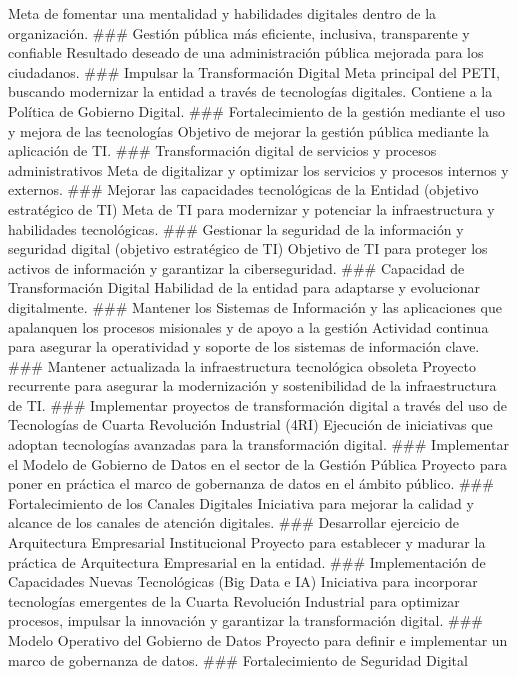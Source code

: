 \documentclass[
	a4paper, %
	12pt, %
]{include/CSSullivanBusinessReport}
\begin{document}
Meta de fomentar una mentalidad y habilidades digitales dentro de la
organización. \#\#\# Gestión pública más eficiente, inclusiva,
transparente y confiable Resultado deseado de una administración pública
mejorada para los ciudadanos. \#\#\# Impulsar la Transformación Digital
Meta principal del PETI, buscando modernizar la entidad a través de
tecnologías digitales. Contiene a la Política de Gobierno Digital.
\#\#\# Fortalecimiento de la gestión mediante el uso y mejora de las
tecnologías Objetivo de mejorar la gestión pública mediante la
aplicación de TI. \#\#\# Transformación digital de servicios y procesos
administrativos Meta de digitalizar y optimizar los servicios y procesos
internos y externos. \#\#\# Mejorar las capacidades tecnológicas de la
Entidad (objetivo estratégico de TI) Meta de TI para modernizar y
potenciar la infraestructura y habilidades tecnológicas. \#\#\#
Gestionar la seguridad de la información y seguridad digital (objetivo
estratégico de TI) Objetivo de TI para proteger los activos de
información y garantizar la ciberseguridad. \#\#\# Capacidad de
Transformación Digital Habilidad de la entidad para adaptarse y
evolucionar digitalmente. \#\#\# Mantener los Sistemas de Información y
las aplicaciones que apalanquen los procesos misionales y de apoyo a la
gestión Actividad continua para asegurar la operatividad y soporte de
los sistemas de información clave. \#\#\# Mantener actualizada la
infraestructura tecnológica obsoleta Proyecto recurrente para asegurar
la modernización y sostenibilidad de la infraestructura de TI. \#\#\#
Implementar proyectos de transformación digital a través del uso de
Tecnologías de Cuarta Revolución Industrial (4RI) Ejecución de
iniciativas que adoptan tecnologías avanzadas para la transformación
digital. \#\#\# Implementar el Modelo de Gobierno de Datos en el sector
de la Gestión Pública Proyecto para poner en práctica el marco de
gobernanza de datos en el ámbito público. \#\#\# Fortalecimiento de los
Canales Digitales Iniciativa para mejorar la calidad y alcance de los
canales de atención digitales. \#\#\# Desarrollar ejercicio de
Arquitectura Empresarial Institucional Proyecto para establecer y
madurar la práctica de Arquitectura Empresarial en la entidad. \#\#\#
Implementación de Capacidades Nuevas Tecnológicas (Big Data e IA)
Iniciativa para incorporar tecnologías emergentes de la Cuarta
Revolución Industrial para optimizar procesos, impulsar la innovación y
garantizar la transformación digital. \#\#\# Modelo Operativo del
Gobierno de Datos Proyecto para definir e implementar un marco de
gobernanza de datos. \#\#\# Fortalecimiento de Seguridad Digital
\end{document}
